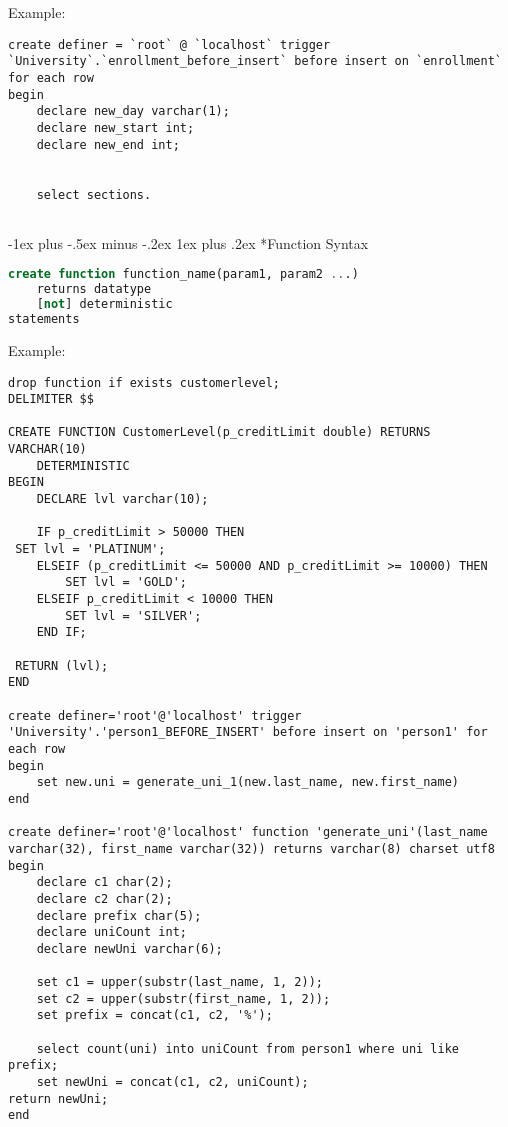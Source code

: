 \documentclass[10pt,landscape]{article}
\makeatletter
\renewcommand{\subsubsection}{\@startsection{subsubsection}{3}{0mm}%
                                {-1ex plus -.5ex minus -.2ex}%
                                {1ex plus .2ex}%
                                {\normalfont\small\bfseries}}
\makeatother
\begin{document}
\begin{multicols}{3}
Example:
\begin{lstlisting}
create definer = `root` @ `localhost` trigger `University`.`enrollment_before_insert` before insert on `enrollment` for each row 
begin
	declare new_day varchar(1);
    declare new_start int;
    declare new_end int;
    
    
    select sections.
	
\end{lstlisting}
\subsubsection*{Function Syntax}
\begin{lstlisting}[language=SQL]
create function function_name(param1, param2 ...)
	returns datatype
    [not] deterministic
statements
\end{lstlisting}

Example:
\begin{lstlisting}
drop function if exists customerlevel;
DELIMITER $$
 
CREATE FUNCTION CustomerLevel(p_creditLimit double) RETURNS VARCHAR(10)
    DETERMINISTIC
BEGIN
    DECLARE lvl varchar(10);
 
    IF p_creditLimit > 50000 THEN
 SET lvl = 'PLATINUM';
    ELSEIF (p_creditLimit <= 50000 AND p_creditLimit >= 10000) THEN
        SET lvl = 'GOLD';
    ELSEIF p_creditLimit < 10000 THEN
        SET lvl = 'SILVER';
    END IF;
 
 RETURN (lvl);
END

create definer='root'@'localhost' trigger 'University'.'person1_BEFORE_INSERT' before insert on 'person1' for each row
begin
	set new.uni = generate_uni_1(new.last_name, new.first_name)
end

create definer='root'@'localhost' function 'generate_uni'(last_name varchar(32), first_name varchar(32)) returns varchar(8) charset utf8
begin
	declare c1 char(2);
    declare c2 char(2);
    declare prefix char(5);
    declare uniCount int;
    declare newUni varchar(6);
    
    set c1 = upper(substr(last_name, 1, 2));
    set c2 = upper(substr(first_name, 1, 2));
    set prefix = concat(c1, c2, '%');
    
    select count(uni) into uniCount from person1 where uni like prefix;
    set newUni = concat(c1, c2, uniCount);
return newUni;
end



\end{lstlisting}



\end{multicols}
\end{document}
